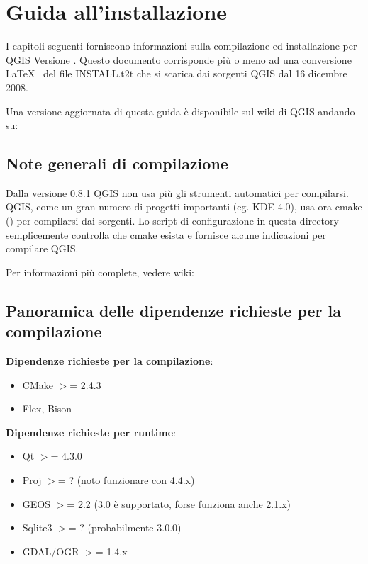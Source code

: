 
\section{Guida all'installazione}\label{label_install}


I capitoli seguenti forniscono informazioni sulla compilazione ed installazione per QGIS
Versione \CURRENT. Questo documento corrisponde più o meno ad una conversione \LaTeX~ del file INSTALL.t2t che si scarica dai sorgenti QGIS dal 16 dicembre 2008.

Una versione aggiornata di questa guida è disponibile sul wiki di QGIS andando su:

\subsection{Note generali di compilazione}
Dalla versione 0.8.1 QGIS non usa più gli strumenti automatici per compilarsi. QGIS, come un gran numero di progetti importanti (eg. KDE 4.0), usa ora cmake () per compilarsi dai sorgenti. Lo script di configurazione in questa directory semplicemente controlla che cmake esista e fornisce alcune indicazioni per compilare QGIS.

Per informazioni più complete, vedere wiki:

\subsection{Panoramica delle dipendenze richieste per la compilazione}

\textbf{Dipendenze richieste per la compilazione}:

\begin{itemize}
\item CMake $>$= 2.4.3
\item Flex, Bison
\end{itemize}

\textbf{Dipendenze richieste per runtime}:

\begin{itemize}
\item Qt $>$= 4.3.0
\item Proj $>$= ? (noto funzionare con 4.4.x)
\item GEOS $>$= 2.2 (3.0 è supportato, forse funziona anche 2.1.x)
\item Sqlite3 $>$= ? (probabilmente 3.0.0)
\item GDAL/OGR $>$= 1.4.x
\end{itemize}

